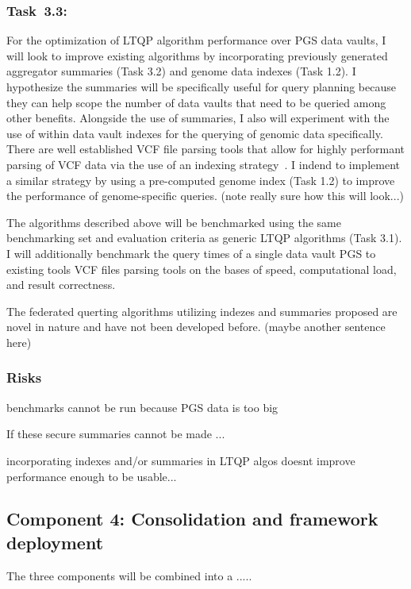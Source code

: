 \documentclass[a4paper,11pt]{article}
\begin{document}
\begin{refsection}
\subsubsection{Task~3.3: \WPcc}

For the optimization of LTQP algorithm performance over PGS data vaults, I will look to improve existing algorithms by incorporating previously generated aggregator summaries (Task 3.2) and genome data indexes (Task 1.2).
I hypothesize the summaries will be specifically useful for query planning because they can help scope the number of data vaults that need to be queried among other benefits. 
Alongside the use of summaries, I also will experiment with the use of within data vault indexes for the querying of genomic data specifically. 
There are well established VCF file parsing tools that allow for highly performant parsing of VCF data via the use of an indexing strategy~\cite{yang_seqminer2_2020}. 
I indend to implement a similar strategy by using a pre-computed genome index (Task 1.2) to improve the performance of genome-specific queries. 
(note really sure how this will look...)

The algorithms described above will be benchmarked using the same benchmarking set and evaluation criteria as generic LTQP algorithms (Task 3.1). 
I will additionally benchmark the query times of a single data vault PGS to existing tools VCF files parsing tools on the bases of speed, computational load, and result correctness.

The federated querting algorithms utilizing indezes and summaries proposed are novel in nature and have not been developed before. 
(maybe another sentence here)


\subsubsection{Risks}

benchmarks cannot be run because PGS data is too big

If these secure summaries cannot be made ...

incorporating indexes and/or summaries in LTQP algos doesnt improve performance enough to be usable...


\newcommand\WPd{Consolidation and framework deployment}
\subsection{Component 4: \WPd}

The three components will be combined into a .....



\end{refsection}
\end{document}
